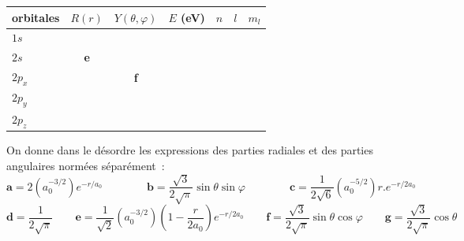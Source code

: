 \begin{center}
\begin{tabular}{|l|c|c|c|c|c| c|}\hline
orbitales & $R(r)$ & $Y(\theta,\varphi)$ & $E$ (eV) & $n$ & $l$ &  $m_l$\\\hline
$1s$   &           &                     & & & &\\\hline
$2s$   & \textbf{e}&                     & & & &\\\hline
$2p_x$ &           & \textbf{f}          & & & &\cellcolor{gray} \\\hline
$2p_y$ &           &                     & & & &\cellcolor{gray}\\\hline
$2p_z$ &           &                     & & & &\\\hline
\end{tabular}
\end{center}

On donne dans le d\'esordre les expressions des parties radiales et des parties angulaires norm\'ees s\'epar\'ement~:\\
$$
\textbf{a}=2\left(a_0^{-3/2}\right)e^{-r/a_0} \qquad \qquad
\textbf{b}=\frac{\sqrt{3}}{2\sqrt{\pi}}\sin{\theta}\sin{\varphi} \qquad \qquad
\textbf{c}=\frac{1}{2\sqrt{6}}\left(a_0^{-5/2}\right)r.e^{-r/2a_0}
$$
$$
\textbf{d}=\frac{1}{2\sqrt{\pi}}\qquad
\textbf{e}=\frac{1}{\sqrt{2}}\left(a_0^{-3/2}\right)\left(1-\frac{r}{2a_0}\right)e^{-r/2a_0}\qquad
\textbf{f}=\frac{\sqrt{3}}{2\sqrt{\pi}}\sin{\theta}\cos{\varphi}\qquad
\textbf{g}=\frac{\sqrt{3}}{2\sqrt{\pi}}\cos{\theta}
$$

